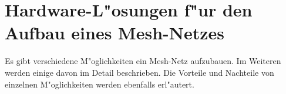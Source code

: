 \section{Hardware-L"osungen f"ur den Aufbau eines Mesh-Netzes}

Es gibt verschiedene M"oglichkeiten ein Mesh-Netz aufzubauen.
Im Weiteren werden einige davon im Detail beschrieben. 
Die Vorteile und Nachteile von einzelnen M"oglichkeiten werden ebenfalls erl"autert.




